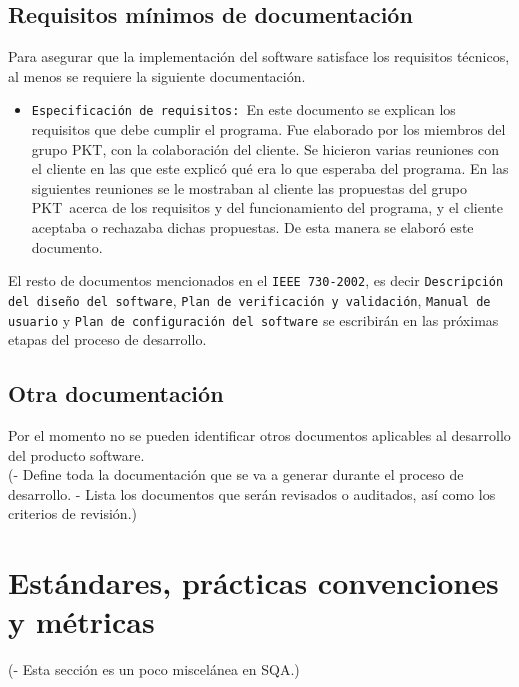 \documentclass[spanish,a4paper,11pt, twoside]{report}	%
\newcommand*{\PKT}{\hbox{P}\kern-2.5pt\lower3.5pt\hbox{\small{K}}\kern-2.8pt\hbox{T}\kern-2pt}	%
\begin{document}
	\section{Requisitos mínimos de documentación}
		Para asegurar que la implementación del software satisface los requisitos técnicos, al menos se requiere la siguiente documentación.
		\begin{itemize}
		  \item \texttt{Especificación de requisitos: }En este documento se explican los requisitos que debe cumplir el programa. 
		  			Fue elaborado por los miembros del grupo \PKT , con la colaboración del cliente. Se hicieron varias reuniones con el cliente 
		  			en las que este explicó qué era lo que esperaba del programa. En las siguientes reuniones se le mostraban al cliente las propuestas del 
		  			grupo \PKT\ acerca de los requisitos y del funcionamiento del programa, y el cliente aceptaba o rechazaba dichas propuestas. 
		  			De esta manera se elaboró este documento.
		\end{itemize}
		El resto de documentos mencionados en el \texttt{IEEE 730-2002}, es decir \texttt{Descripción del diseño del software}, \texttt{Plan de verificación y validación}, 
		\texttt{Manual de usuario} y  \texttt{Plan de configuración del software} se escribirán en las próximas etapas del proceso de desarrollo. 
	\section{Otra documentación}
		Por el momento no se pueden identificar otros documentos aplicables al desarrollo del producto software.\\
	(- Define toda la documentación que se va a generar
	durante el proceso de desarrollo.
	- Lista los documentos que serán revisados o
	auditados, así como los criterios de revisión.)

\newpage
\mbox{}
\thispagestyle{empty}						%
\newpage

\chapter{ Estándares, prácticas convenciones y métricas}
	(- Esta sección es un poco miscelánea en SQA.) %

\newpage
\mbox{}
\thispagestyle{empty}						%
\newpage
\end{document}
